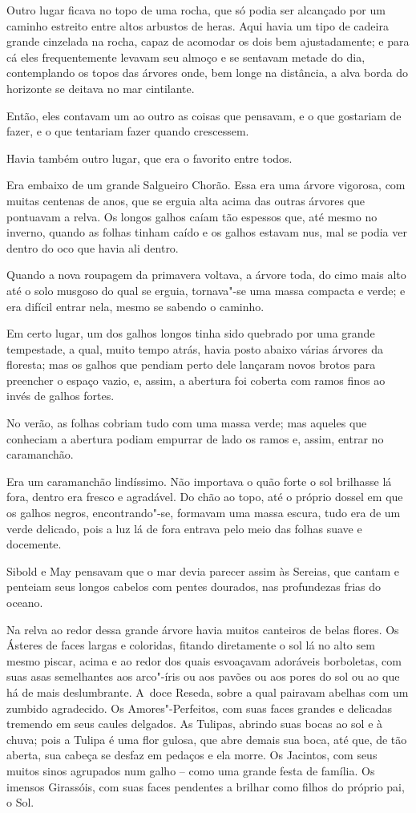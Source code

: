 Outro lugar ficava no topo de uma rocha, que só podia ser alcançado por
um caminho estreito entre altos arbustos de heras. Aqui havia um tipo de
cadeira grande cinzelada na rocha, capaz de acomodar os dois bem
ajustadamente; e para cá eles frequentemente levavam seu almoço e se
sentavam metade do dia, contemplando os topos das árvores onde, bem
longe na distância, a alva borda do horizonte se deitava no mar
cintilante.

Então, eles contavam um ao outro as coisas que pensavam, e o que
gostariam de fazer, e o que tentariam fazer quando crescessem.

Havia também outro lugar, que era o favorito entre todos.

Era embaixo de um grande Salgueiro Chorão. Essa era uma árvore vigorosa,
com muitas centenas de anos, que se erguia alta acima das outras árvores
que pontuavam a relva. Os longos galhos caíam tão espessos que, até
mesmo no inverno, quando as folhas tinham caído e os galhos estavam nus,
mal se podia ver dentro do oco que havia ali dentro.

Quando a nova roupagem da primavera voltava, a árvore toda, do cimo mais
alto até o solo musgoso do qual se erguia, tornava"-se uma massa compacta
e verde; e era difícil entrar nela, mesmo se sabendo o caminho.

Em certo lugar, um dos galhos longos tinha sido quebrado por uma grande
tempestade, a qual, muito tempo atrás, havia posto abaixo várias árvores
da floresta; mas os galhos que pendiam perto dele lançaram novos brotos
para preencher o espaço vazio, e, assim, a abertura foi coberta com
ramos finos ao invés de galhos fortes.

No verão, as folhas cobriam tudo com uma massa verde; mas aqueles que
conheciam a abertura podiam empurrar de lado os ramos e, assim, entrar
no caramanchão.

Era um caramanchão lindíssimo. Não importava o quão forte o sol
brilhasse lá fora, dentro era fresco e agradável. Do chão ao topo, até o
próprio dossel em que os galhos negros, encontrando"-se, formavam uma
massa escura, tudo era de um verde delicado, pois a luz lá de fora
entrava pelo meio das folhas suave e docemente.

Sibold e May pensavam que o mar devia parecer assim às Sereias, que
cantam e penteiam seus longos cabelos com pentes dourados, nas
profundezas frias do oceano.

Na relva ao redor dessa grande árvore havia muitos canteiros de belas
flores. Os Ásteres de faces largas e coloridas, fitando diretamente o
sol lá no alto sem mesmo piscar, acima e ao redor dos quais esvoaçavam
adoráveis borboletas, com suas asas semelhantes aos arco"-íris ou aos
pavões ou aos pores do sol ou ao que há de mais deslumbrante. A~doce
Reseda, sobre a qual pairavam abelhas com um zumbido agradecido. Os
Amores"-Perfeitos, com suas faces grandes e delicadas tremendo em seus
caules delgados. As Tulipas, abrindo suas bocas ao sol e à chuva; pois a
Tulipa é uma flor gulosa, que abre demais sua boca, até que, de tão
aberta, sua cabeça se desfaz em pedaços e ela morre. Os Jacintos, com
seus muitos sinos agrupados num galho -- como uma grande festa de
família. Os imensos Girassóis, com suas faces pendentes a brilhar como
filhos do próprio pai, o Sol.

